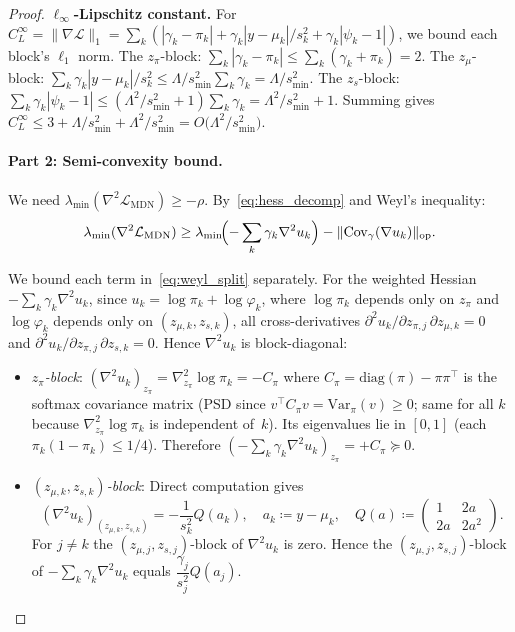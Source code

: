 \documentclass[11pt]{article}
\newcommand{\cL}{\mathcal{L}}
\begin{document}
\begin{proof}
\textbf{$\ell_\infty$-Lipschitz constant.}
For $C_L^\infty = \|\nabla\cL\|_1 = \sum_k (|\gamma_k-\pi_k|
+ \gamma_k|y-\mu_k|/s_k^2 + \gamma_k|\psi_k-1|)$, we bound each
block's $\ell_1$ norm.
The $z_\pi$-block: $\sum_k |\gamma_k - \pi_k| \le \sum_k(\gamma_k+\pi_k) = 2$.
The $z_\mu$-block:
$\sum_k \gamma_k|y-\mu_k|/s_k^2
\le \Lambda/s_{\min}^2\sum_k \gamma_k = \Lambda/s_{\min}^2$.
The $z_s$-block:
$\sum_k \gamma_k|\psi_k-1|
\le (\Lambda^2/s_{\min}^2+1)\sum_k \gamma_k
= \Lambda^2/s_{\min}^2+1$.
Summing gives $C_L^\infty \le 3 + \Lambda/s_{\min}^2
+ \Lambda^2/s_{\min}^2 = O\!\bigl(\Lambda^2/s_{\min}^2\bigr)$.

\paragraph{Part 2: Semi-convexity bound.}
We need $\lambda_{\min}(\nabla^2 \cL_{\mathrm{MDN}}) \ge -\rho$.
By~\eqref{eq:hess_decomp} and Weyl's inequality:
\begin{equation}\label{eq:weyl_split}
  \lambda_{\min}(\nabla^2 \cL_{\mathrm{MDN}})
  \ge \lambda_{\min}\!\Bigl(-\sum_k \gamma_k \nabla^2 u_k\Bigr)
  - \|\mathrm{Cov}_\gamma(\nabla u_k)\|_{\mathrm{op}}.
\end{equation}

We bound each term in~\eqref{eq:weyl_split} separately.
For the weighted Hessian $-\sum_k \gamma_k \nabla^2 u_k$,
since $u_k = \log \pi_k + \log \varphi_k$, where $\log\pi_k$ depends
only on $z_\pi$ and $\log\varphi_k$ depends only on $(z_{\mu,k},z_{s,k})$,
all cross-derivatives $\partial^2 u_k/\partial z_{\pi,j}\,\partial z_{\mu,k} = 0$
and $\partial^2 u_k/\partial z_{\pi,j}\,\partial z_{s,k} = 0$.
Hence $\nabla^2 u_k$ is block-diagonal:
\begin{itemize}[leftmargin=*,itemsep=0pt]
\item \emph{$z_\pi$-block}: $(\nabla^2 u_k)_{z_\pi}
  = \nabla^2_{z_\pi}\log\pi_k = -C_\pi$
  where $C_\pi = \mathrm{diag}(\pi)-\pi\pi^\top$ is the softmax
  covariance matrix (PSD since
  $v^\top C_\pi v = \mathrm{Var}_\pi(v) \ge 0$; same for all $k$
  because $\nabla^2_{z_\pi}\log\pi_k$ is independent of~$k$).
  Its eigenvalues lie in $[0,1]$ (each $\pi_k(1-\pi_k) \le 1/4$).
  Therefore $(-\sum_k\gamma_k\nabla^2 u_k)_{z_\pi} = +C_\pi \succeq 0$.
\item \emph{$(z_{\mu,k},z_{s,k})$-block}: Direct computation gives
  \[
    (\nabla^2 u_k)_{(z_{\mu,k},z_{s,k})}
    = -\frac{1}{s_k^2} Q(a_k),
    \quad a_k \coloneqq y - \mu_k,\quad
    Q(a) \coloneqq \begin{pmatrix} 1 & 2a \\ 2a & 2a^2 \end{pmatrix}.
  \]
  For $j \ne k$ the $(z_{\mu,j},z_{s,j})$-block of $\nabla^2 u_k$ is zero.
  Hence the $(z_{\mu,j},z_{s,j})$-block of $-\sum_k\gamma_k\nabla^2 u_k$
  equals $\dfrac{\gamma_j}{s_j^2} Q(a_j)$.
\end{itemize}


\end{proof}
\end{document}
